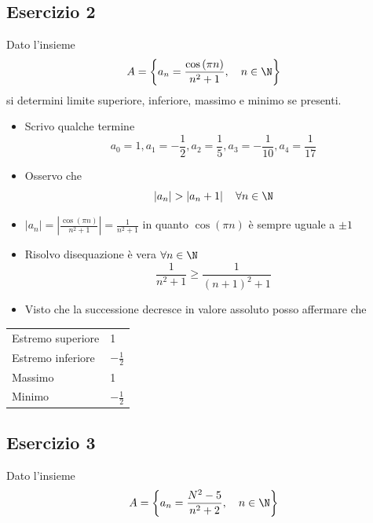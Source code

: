 \subsection{Esercizio 2}
Dato l'insieme
\[
	A = \left\{ a_n = \frac{\cos \left( \pi n  \right)}{n^2 + 1}, \quad n  \in \N  \right\}
\]
si determini limite superiore, inferiore, massimo e minimo se presenti.
\begin{itemize}
	\item Scrivo qualche termine  \[
		      a_0 = 1 , a_1 = -\frac{1}{2}, a_2= \frac{1}{5}, a_3 = -\frac{1}{10}, a_4=\frac{1}{17}
	      \]
	\item Osservo che \[
		      \left|a_n\right|> \left|a_n+1\right| \quad \forall n  \in  \N
	      \]
	\item $\left|a_n\right| = \left| \frac{\cos \left( \pi n \right) }{n^2 +1}\right|= \frac{1}{n^2 + 1}$ in quanto $\cos\left( \pi n \right) $ è sempre uguale a $\pm 1$
	\item Risolvo disequazione \rarr è vera $ \forall n  \in  \N$
	      \[
		      \frac{1}{n^2 +1} \ge \frac{1}{\left( n+1 \right) ^2 + 1}
	      \]
	\item Visto che la successione decresce in valore assoluto posso affermare che
\end{itemize}

\begin{table}[H]
	\centering
	\begin{tabular}{|ll|}
		\hline
		Estremo superiore & 1              \\
		Estremo inferiore & $-\frac{1}{2}$ \\
		Massimo           & 1              \\
		Minimo            & $-\frac{1}{2}$ \\
		\hline
	\end{tabular}
\end{table}
\subsection{Esercizio 3}
Dato l'insieme
\[
	A = \left\{ a_n = \frac{N^2 - 5}{n^2 +2}, \quad  n  \in  \N \right\}
\]

